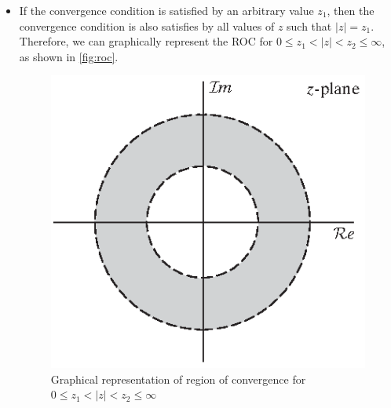\begin{itemize}
    \item If the convergence condition is satisfied by an arbitrary value $z_1$, then the convergence condition is also satisfies by all values of $z$ such that $\lvert z \rvert = z_1$. Therefore, we can graphically represent the ROC for $0 \leq z_1 < \lvert z \rvert < z_2 \leq \infty$, as shown in \autoref{fig:roc}.
    
    \begin{figure}[H]
        \centering
        \includegraphics{images/region_of_conv.eps}
        \caption{Graphical representation of region of convergence for $0 \leq z_1 < \lvert z \rvert < z_2 \leq \infty$}
        \label{fig:roc}
    \end{figure}
\end{itemize}

